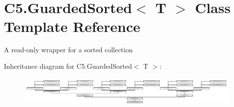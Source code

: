 \hypertarget{class_c5_1_1_guarded_sorted}{}\section{C5.\+Guarded\+Sorted$<$ T $>$ Class Template Reference}
\label{class_c5_1_1_guarded_sorted}


A read-\/only wrapper for a sorted collection  


Inheritance diagram for C5.\+Guarded\+Sorted$<$ T $>$\+:\begin{figure}[H]
\begin{center}
\leavevmode
\includegraphics[height=1.533646cm]{class_c5_1_1_guarded_sorted}
\end{center}
\end{figure}
